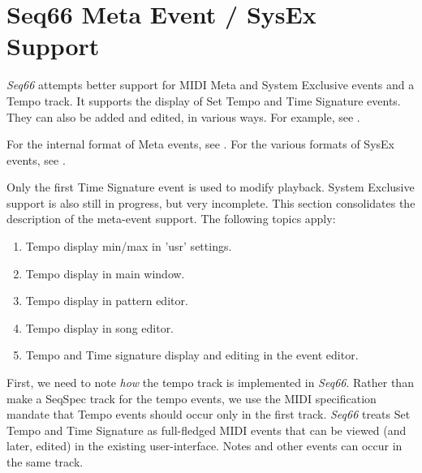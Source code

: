%
%
%

\section{Seq66 Meta Event / SysEx Support}
\label{sec:meta_events}

   \textsl{Seq66} attempts better support
   for MIDI Meta and System Exclusive events and a Tempo track.
   It supports the display of Set Tempo and Time Signature events.
   They can also be added and edited, in
   various ways.  For example, see .

   For the internal format of Meta events,
   see .
   For the various formats of SysEx events, see
   .

   Only the first Time Signature event is used to modify playback.
   System Exclusive support is also still in progress, but very incomplete.
   This section consolidates the description of the meta-event support.
   The following topics apply:

   \begin{enumerate}
      \item Tempo display min/max in 'usr' settings.
      \item Tempo display in main window.
      \item Tempo display in pattern editor.
      \item Tempo display in song editor.
      \item Tempo and Time signature display and editing in the event editor.
   \end{enumerate}

   First, we need to note \textsl{how} the tempo track is
   implemented in \textsl{Seq66}.  Rather than make a SeqSpec track for
   the tempo events, we use the MIDI specification mandate that
   Tempo events should occur only in the first track.
   \textsl{Seq66} treats Set Tempo and Time Signature as full-fledged
   MIDI events that can be viewed (and later, edited) in the existing
   user-interface.  Notes and other events can occur in the same
   track.

